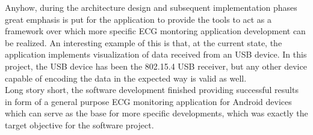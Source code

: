 		Anyhow, during the architecture design and subsequent implementation phases great emphasis is put for the application to provide the tools to act as a framework over which more specific ECG montoring application development can be realized. An interesting example of this is that, at the current state, the application implements visualization of data received from an USB device. In this project, the USB device has been the 802.15.4 USB receiver, but any other device capable of encoding the data in the expected way is valid as well.\\

		Long story short, the software development finished providing successful results in form of a general purpose ECG monitoring application for Android devices which can serve as the base for more specific developments, which was exactly the target objective for the software project.

